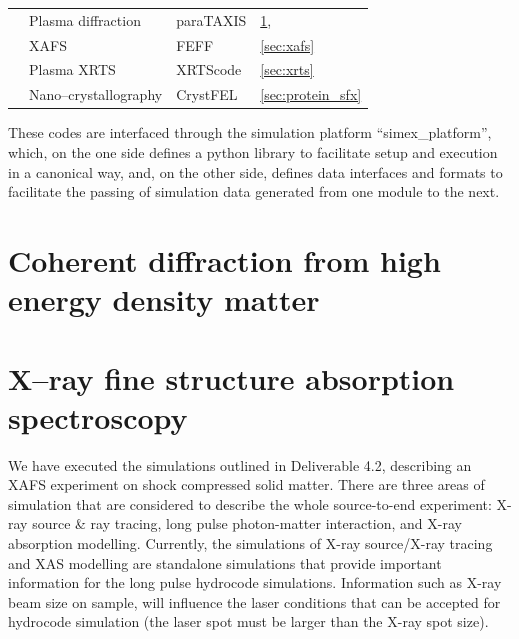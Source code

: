 \documentclass[12pt]{scrartcl}
\begin{document}
\begin{table}
\begin{center}
\begin{tabular}[ht]{|l|l|l|l|}
      & Plasma diffraction              & paraTAXIS             &
      \ref{sec:plasma_diffraction},\cite{EUCALL_SIMEX_D4.1,Kluge2016,
      Garten2017.zenodo.885033}  \\
      & XAFS                            & FEFF                  & \ref{sec:xafs}
      \cite{EUCALL_SIMEX_D4.2,Torchio2016,Harmand2015,Mazevet2014}  \\
      & Plasma XRTS                     & XRTScode              & \ref{sec:xrts} \cite{Fortmann2009d}               \\
      & Nano--crystallography           & CrystFEL              & \ref{sec:protein_sfx}         \\
    \hline
  \end{tabular}
  \end{center}
\end{table}

These codes are interfaced through the simulation platform ``simex\_platform'', which,
on the one side defines a python library to facilitate setup
and execution in a canonical way, and, on the other side, defines data interfaces
and formats to facilitate the passing of simulation data generated from one
module to the next.

\section{Coherent diffraction from high energy density matter}\label{sec:plasma_diffraction}


\section{X--ray fine structure absorption spectroscopy\label{sec:xafs}}
%
We have executed the simulations outlined in Deliverable
4.2\cite{EUCALL_SIMEX_D4.2}, describing an XAFS experiment on shock compressed
solid matter. There are three areas of simulation that are considered to describe the
whole source-to-end experiment: X-ray source \& ray tracing, long pulse photon-matter
interaction, and X-ray absorption modelling. Currently, the simulations of X-ray
source/X-ray tracing and XAS modelling are standalone simulations that provide
important information for the long pulse hydrocode simulations. Information
such as X-ray beam size on sample, will influence the laser conditions that can
be accepted for hydrocode simulation (the laser spot must be larger than the
X-ray spot size).
\end{document}
